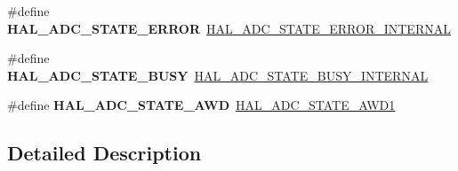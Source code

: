 \begin{DoxyCompactItemize}
\item 
\hypertarget{group___h_a_l___a_d_c___aliased___defines_ga83e3447e639d1a9019732255700ac23a}{\#define {\bfseries H\-A\-L\-\_\-\-A\-D\-C\-\_\-\-S\-T\-A\-T\-E\-\_\-\-E\-R\-R\-O\-R}~\hyperlink{group___a_d_c___exported___types_ga65b592627f1f9277f4b89bfc33a9e641}{H\-A\-L\-\_\-\-A\-D\-C\-\_\-\-S\-T\-A\-T\-E\-\_\-\-E\-R\-R\-O\-R\-\_\-\-I\-N\-T\-E\-R\-N\-A\-L}}\label{group___h_a_l___a_d_c___aliased___defines_ga83e3447e639d1a9019732255700ac23a}

\item 
\hypertarget{group___h_a_l___a_d_c___aliased___defines_ga063cc0bfc15747a4c96d2868273a4516}{\#define {\bfseries H\-A\-L\-\_\-\-A\-D\-C\-\_\-\-S\-T\-A\-T\-E\-\_\-\-B\-U\-S\-Y}~\hyperlink{group___a_d_c___exported___types_ga7055248355e179ee208d23bd2ce8ba69}{H\-A\-L\-\_\-\-A\-D\-C\-\_\-\-S\-T\-A\-T\-E\-\_\-\-B\-U\-S\-Y\-\_\-\-I\-N\-T\-E\-R\-N\-A\-L}}\label{group___h_a_l___a_d_c___aliased___defines_ga063cc0bfc15747a4c96d2868273a4516}

\item 
\hypertarget{group___h_a_l___a_d_c___aliased___defines_ga3147b9039ee1bc08da805d57a5136cd1}{\#define {\bfseries H\-A\-L\-\_\-\-A\-D\-C\-\_\-\-S\-T\-A\-T\-E\-\_\-\-A\-W\-D}~\hyperlink{group___a_d_c___exported___types_ga39ce295171a5e608097017fda4cfd7d5}{H\-A\-L\-\_\-\-A\-D\-C\-\_\-\-S\-T\-A\-T\-E\-\_\-\-A\-W\-D1}}\label{group___h_a_l___a_d_c___aliased___defines_ga3147b9039ee1bc08da805d57a5136cd1}

\end{DoxyCompactItemize}


\subsection{Detailed Description}

